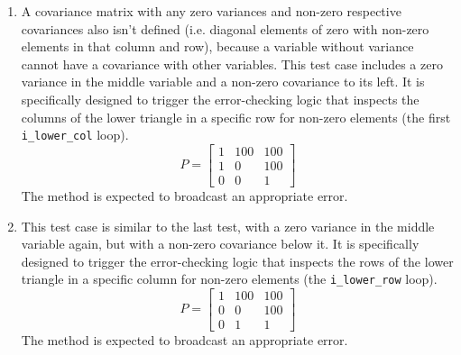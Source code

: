\documentclass[11pt,fleqn]{report}
\begin{document}
\begin{enumerate}
{(\ref{eqn:corr_coeff}) to produce an identity matrix of that size, because the variables
will only be correlated with themselves (i.e. the diagonal is filled with ones and
the rest is zero):
\begin{equation*}
P = 
\begin{bmatrix}
1 & 100 & 100 \\
0 & 2 & 100 \\
0 & 0 & 3
\end{bmatrix} \quad \Longrightarrow \quad 
\rho = 
\begin{bmatrix}
1 & 0 & 0 \\
0 & 1 & 0 \\
0 & 0 & 1
\end{bmatrix} 
\end{equation*}
}
\item{
A covariance matrix with any zero variances and non-zero respective covariances also isn't 
defined (i.e. diagonal elements of zero with non-zero elements in that column and row), 
because a variable without variance cannot have a covariance with other variables. This test 
case includes a zero variance in the middle variable and a non-zero covariance to its left.
It is specifically designed to trigger the error-checking logic that inspects the columns
of the lower triangle in a specific row for non-zero elements 
(the first \texttt{i\_lower\_col} loop).
\begin{equation*}
P = 
\begin{bmatrix}
1 & 100 & 100 \\
1 & 0 & 100 \\
0 & 0 & 1
\end{bmatrix} 
\end{equation*}
The method is expected to broadcast an appropriate error.
}
\item{
This test case is similar to the last test, with a zero variance in the middle variable 
again, but with a non-zero covariance below it. It is specifically designed to trigger 
the error-checking logic that inspects the rows of the lower triangle in a specific column
for non-zero elements (the \texttt{i\_lower\_row} loop).
\begin{equation*}
P = 
\begin{bmatrix}
1 & 100 & 100 \\
0 & 0 & 100 \\
0 & 1 & 1
\end{bmatrix} 
\end{equation*}
The method is expected to broadcast an appropriate error.
}
\end{enumerate}
\end{document}
